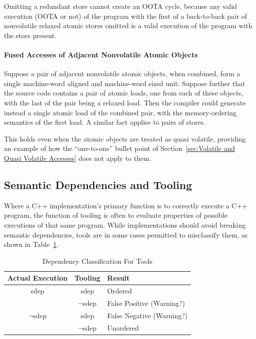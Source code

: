 \documentclass[10]{article}
\begin{document}
Omitting a redundant store cannot create an OOTA cycle,
because any valid execution (OOTA or not)
of the program with the first of a back-to-back pair of nonvolatile
relaxed atomic stores omitted is a valid execution of the
program with the store present.

\paragraph{Fused Accesses of Adjacent Nonvolatile Atomic Objects}
Suppose a pair of adjacent nonvolatile atomic objects, when combined,
form a single machine-word aligned and machine-word sized unit.
Suppose further that the source code contains a pair of atomic
loads, one from each of these objects, with the last of the pair
being a relaxed load.
Then the compiler could generate instead
a single atomic load of the combined pair,
with the memory-ordering semantics of the first load.
A similar fact applies to pairs of stores.

This holds even when the atomic objects are treated as quasi volatile,
providing an example of how the ``one-to-one'' bullet point of
Section~\ref{sec:Volatile and Quasi Volatile Accesses} does not apply
to them.

\subsection{Semantic Dependencies and Tooling}
\label{sec:Semantic Dependencies and Tooling}

Where a C++ implementation's primary function is to correctly execute
a C++ program, the function of tooling is often to evaluate properties
of possible executions of that same program.
While implementations should avoid breaking semantic dependencies,
tools are in some cases permitted to misclassify them, as shown in
Table~\ref{tab:Dependency Classification For Tools}.

\begin{table}
\centering
\begin{tabular}{c|c|l}
Actual Execution	& Tooling		& Result \\
\hline
sdep			& sdep			& Ordered \\
\cline{2-3}
			& $\neg$sdep		& False Positive (Warning?) \\
\hline
$\neg$sdep		& sdep			& False Negative (Warning?) \\
\cline{2-3}
			& $\neg$sdep		& Unordered \\
\end{tabular}
\caption{Dependency Classification For Tools}
\label{tab:Dependency Classification For Tools}
\end{table}
\end{document}
